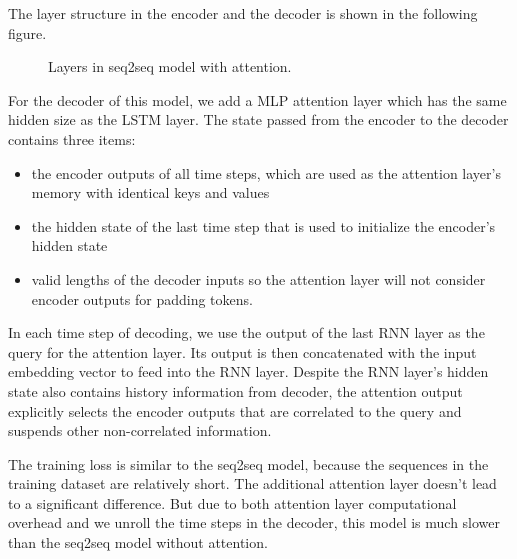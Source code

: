 The layer structure in the encoder and the decoder is shown in the following figure.

\begin{figure}[hpt]
	\centering
	
	\caption{Layers in seq2seq model with attention.}
	\label{fig:seq2seq-attention-details}
\end{figure}

For the decoder of this model, we add a MLP attention layer which has the same hidden size as the LSTM layer. The state passed from the encoder to the decoder contains three items:

\begin{itemize}
    \item the encoder outputs of all time steps, which are used as the attention layer's memory with identical keys and values
    \item the hidden state of the last time step that is used to initialize the encoder's hidden state  
    \item valid lengths of the decoder inputs so the attention layer will not consider encoder outputs for padding tokens.
\end{itemize}

In each time step of decoding, we use the output of the last RNN layer as the query for the attention layer. Its output is then concatenated with the input embedding vector to feed into the RNN layer. Despite the RNN layer's hidden state also contains history information from decoder, the attention output explicitly selects the encoder outputs that are correlated to the query and suspends other non-correlated information.

The training loss is similar to the seq2seq model, because the sequences in the training dataset are relatively short. The additional attention layer doesn’t lead to a significant difference. But due to both attention layer computational overhead and we unroll the time steps in the decoder, this model is much slower than the seq2seq model without attention.